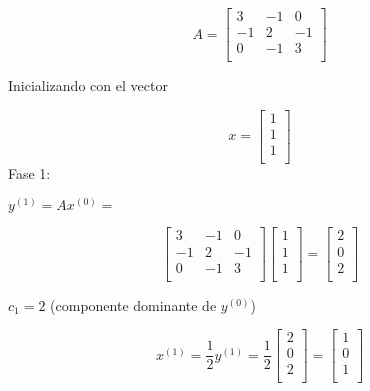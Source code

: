 \[
  A =
  \left[ {\begin{array}{ccc}
   3 & -1 & 0 \\
   -1 & 2 & -1 \\
   0 & -1 & 3 \\
  \end{array} } \right]
\]

Inicializando con el vector 

\[
  x =
  \left[ {\begin{array}{c}
   1  \\
   1 \\
   1  \\
  \end{array} } \right]
\]
\newpage
Fase 1: 

\begin{center} 
$y^{(1)} = Ax^{(0)} =$
\end{center}
\[
  \left[ {\begin{array}{ccc}
   3 & -1 & 0 \\
   -1 & 2 & -1 \\
   0 & -1 & 3 \\
  \end{array} } \right]
  \left[ {\begin{array}{c}
   1  \\
   1 \\
   1  \\
  \end{array} } \right]
  = 
    \left[ {\begin{array}{c}
   2  \\
   0 \\
   2  \\
  \end{array} } \right]
\]
\begin{center} 
$c_1 = 2$ (componente dominante de $ y^{(0)}$)


\[
x^{(1)} = \frac{1}{2}y^{(1)} = \frac{1}{2} 
  \left[ {\begin{array}{c}
   2  \\
   0 \\
   2 \\
  \end{array} } \right]
  =
  \left[ {\begin{array}{c}
   1  \\
   0 \\
   1 \\
  \end{array} } \right]
\]

\end{center}



